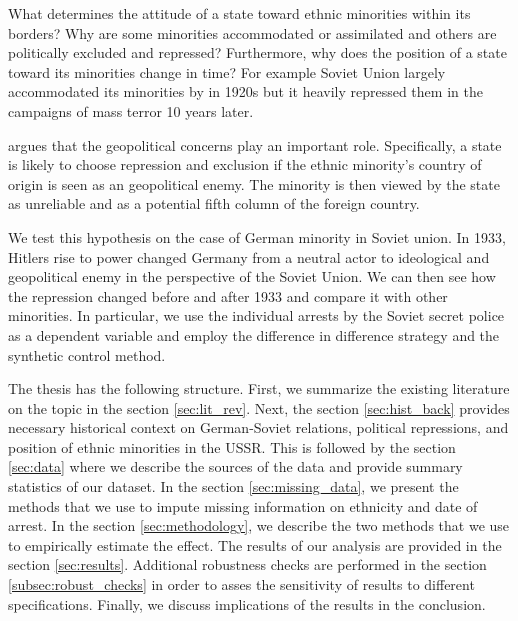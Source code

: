 What determines the attitude of a state toward ethnic minorities within
its borders? Why are some minorities accommodated or assimilated and
others are politically excluded and repressed? Furthermore,  why does the
position of a state toward its minorities change in time? For example
Soviet Union largely accommodated its minorities by in 1920s but it
heavily repressed them in the campaigns of  mass terror 10 years later. 

\citet{mylonas_politics_2013} argues that the geopolitical concerns play an important role. Specifically, a state is likely to choose repression and
exclusion if the ethnic minority's country of origin is seen as an
geopolitical enemy. The minority is then viewed by the state as
unreliable and as a potential fifth column of the foreign country.   

We test this hypothesis on the case of German minority in Soviet union.
In 1933, Hitlers rise to power changed Germany from a neutral actor to ideological and geopolitical enemy in the perspective of the Soviet Union. We can then see how the repression changed before and after 1933 and compare it with other minorities. In particular, we use the individual arrests by the Soviet secret police as a dependent variable and employ the difference in difference strategy and the synthetic control method. 

The thesis has the following structure. First, we summarize the existing literature on the topic in the section \ref{sec:lit_rev}. Next, the section \ref{sec:hist_back} provides necessary historical context on German-Soviet relations, political repressions, and position of ethnic minorities in the USSR. This is followed by the section \ref{sec:data} where we describe the sources of the data and provide summary statistics of our  dataset. 
In the section \ref{sec:missing_data}, we present the methods that we use to impute missing information on ethnicity and  date of arrest. In the section \ref{sec:methodology}, we  describe the two methods that we use to empirically estimate the effect. 
The results of our analysis  are provided in the section \ref{sec:results}. Additional robustness checks are performed in the section \ref{subsec:robust_checks} in order to asses the sensitivity of results to different specifications. Finally, we discuss implications of the results in the conclusion. 

